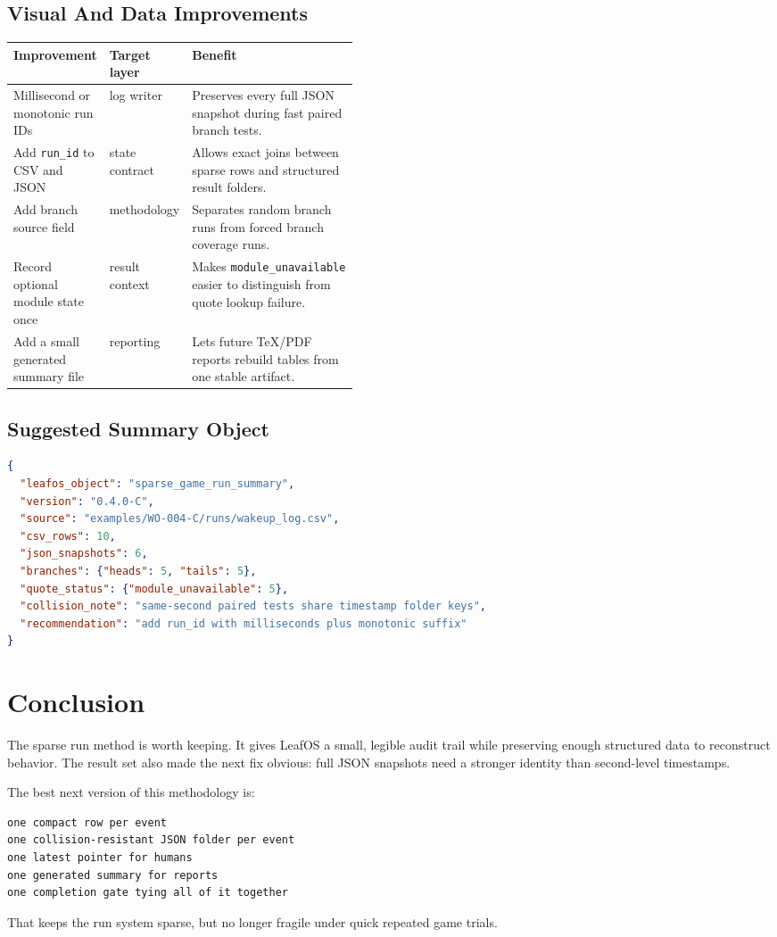 \documentclass[11pt,a4paper]{article}
\newcommand{\tighttable}{\renewcommand{\arraystretch}{1.16}\small}
\begin{document}
\subsection{Visual And Data Improvements}

\tighttable
\begin{tabularx}{\linewidth}{@{}p{0.25\linewidth}p{0.20\linewidth}X@{}}
\toprule
Improvement & Target layer & Benefit \\
\midrule
Millisecond or monotonic run IDs & log writer &
Preserves every full JSON snapshot during fast paired branch tests. \\
Add \texttt{run\_id} to CSV and JSON & state contract &
Allows exact joins between sparse rows and structured result folders. \\
Add branch source field & methodology &
Separates random branch runs from forced branch coverage runs. \\
Record optional module state once & result context &
Makes \texttt{module\_unavailable} easier to distinguish from quote lookup failure. \\
Add a small generated summary file & reporting &
Lets future TeX/PDF reports rebuild tables from one stable artifact. \\
\bottomrule
\end{tabularx}
\normalsize

\subsection{Suggested Summary Object}

\begin{lstlisting}[language=json]
{
  "leafos_object": "sparse_game_run_summary",
  "version": "0.4.0-C",
  "source": "examples/WO-004-C/runs/wakeup_log.csv",
  "csv_rows": 10,
  "json_snapshots": 6,
  "branches": {"heads": 5, "tails": 5},
  "quote_status": {"module_unavailable": 5},
  "collision_note": "same-second paired tests share timestamp folder keys",
  "recommendation": "add run_id with milliseconds plus monotonic suffix"
}
\end{lstlisting}

\section{Conclusion}

The sparse run method is worth keeping. It gives LeafOS a small, legible audit
trail while preserving enough structured data to reconstruct behavior. The
result set also made the next fix obvious: full JSON snapshots need a stronger
identity than second-level timestamps.

The best next version of this methodology is:

\begin{lstlisting}[language={}]
one compact row per event
one collision-resistant JSON folder per event
one latest pointer for humans
one generated summary for reports
one completion gate tying all of it together
\end{lstlisting}

That keeps the run system sparse, but no longer fragile under quick repeated
game trials.
\end{document}

